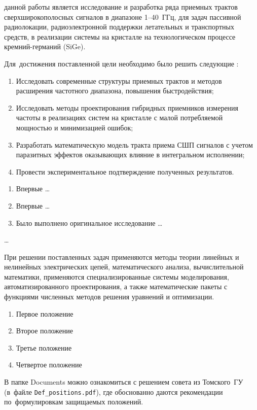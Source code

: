 
{\aim} данной работы является исследование и разработка ряда приемных трактов сверхширокополосных сигналов в диапазоне \numrange[]{1}{40}~ГГц, для задач пассивной радиолокации, радиоэлектронной поддержки летательных и транспортных средств, в реализации системы на кристалле на технологическом процессе кремний-германий (SiGe).

Для~достижения поставленной цели необходимо было решить следующие {\tasks}:
\begin{enumerate}[beginpenalty=10000] %
  \item Исследовать современные структуры приемных трактов и методов расширения частотного диапазона, повышения быстродействия;
  \item Исследовать методы проектирования гибридных приемников измерения частоты в реализациях систем на кристалле с малой потребляемой мощностью и минимизацией ошибок;
  \item Разработать математическую модель тракта приема СШП сигналов с учетом паразитных эффектов оказывающих влияние в интегральном исполнении;
  \item Провести экспериментальное подтверждение полученных результатов.
\end{enumerate}

{\novelty}
\begin{enumerate}[beginpenalty=10000] %
  \item Впервые \ldots
  \item Впервые \ldots
  \item Было выполнено оригинальное исследование \ldots
\end{enumerate}

{\influence} \ldots

{\methods}
При решении поставленных задач применяются методы теории линейных и нелинейных электрических цепей, математического анализа, вычислительной математики, применяются специализированные системы моделирования, автоматизированного проектирования, а также математические пакеты с функциями численных методов решения уравнений и оптимизации.

{}
\begin{enumerate}[beginpenalty=10000] %
  \item Первое положение
  \item Второе положение
  \item Третье положение
  \item Четвертое положение
\end{enumerate}
В папке Documents можно ознакомиться с решением совета из Томского~ГУ
(в~файле \verb+Def_positions.pdf+), где обоснованно даются рекомендации
по~формулировкам защищаемых положений.

